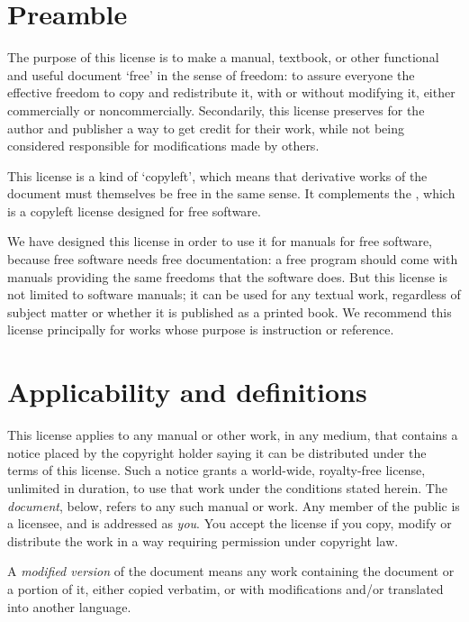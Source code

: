 \begin{multicols}{3}

\section{Preamble}
\label{fdl:preamble}

The purpose of this license is to make a manual, textbook, or other functional and useful document \enquote*{free} in the sense of freedom: to assure everyone the effective freedom to copy and redistribute it, with or without modifying it, either commercially or noncommercially. Secondarily, this license preserves for the author and publisher a way to get credit for their work, while not being considered responsible for modifications made by others.

This license is a kind of \enquote*{copyleft}, which means that derivative works of the document must themselves be free in the same sense. It complements the \gpl, which is a copyleft license designed for free software.

We have designed this license in order to use it for manuals for free software, because free software needs free documentation: a free program should come with manuals providing the same freedoms that the software does. But this license is not limited to software manuals; it can be used for any textual work, regardless of subject matter or whether it is published as a printed book. We recommend this license principally for works whose purpose is instruction or reference.

\section{Applicability and definitions}
\label{fdl:defs}

This license applies to any manual or other work, in any medium, that contains a notice placed by the copyright holder saying it can be distributed under the terms of this license. Such a notice grants a world-wide, royalty-free license, unlimited in duration, to use that work under the conditions stated herein. The \emph{document}, below, refers to any such manual or work. Any member of the public is a licensee, and is addressed as \emph{you}. You accept the license if you copy, modify or distribute the work in a way requiring permission under copyright law.

A \emph{modified version} of the document means any work containing the document or a portion of it, either copied verbatim, or with modifications and\slash or translated into another language.


\end{multicols}
